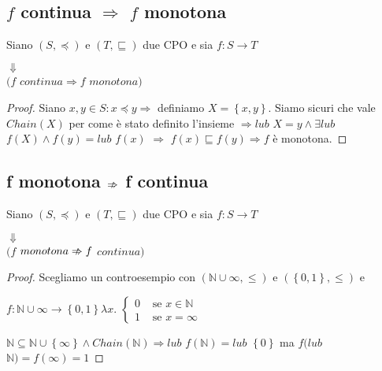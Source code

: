 \documentclass[a4paper, 10pt]{article} %
\begin{document}
\
\subsection{$f$  continua $\Rightarrow$ $f$  monotona}
\begin{esercizio}
  Siano $(S, \preceq)$ e $(T, \sqsubseteq)$ due CPO e sia $f: S \rightarrow T $
  \begin{center}
    $\Downarrow$\\
    $(f$ $continua \Rightarrow f$ $monotona)$
  \end{center}    
  \begin{proof}
    Siano $x,y \in S : x \preceq y \Rightarrow $ definiamo $X = \left\{x,y\right\}$. Siamo sicuri che vale $Chain(X)$ per come è stato definito l'insieme $\Rightarrow lub$ $X = y \land \exists lub$ $f(X) \land f(y) = lub$ $f(x)$ $\Rightarrow$ $f(x) \sqsubseteq f(y) \Rightarrow f$ è monotona.
  \end{proof}
\end{esercizio}

\newpage
\subsection{f monotona $\Arrownot \Rightarrow$ f continua}
\begin{esercizio}
  Siano $(S, \preceq)$ e $(T, \sqsubseteq)$ due CPO e sia $f: S \rightarrow T$
  \begin{center}
    $\Downarrow$\\
    $(f$ $monotona \Arrownot \Rightarrow f$ $continua)$
  \end{center}
  \begin{proof}
    Scegliamo un controesempio con $(\mathbb{N} \cup \infty, \leq)$ e $(\left\{0,1\right\},\leq)$ e
    \begin{center}
      $f: \mathbb{N} \cup \infty \rightarrow \left\{0,1\right\} \lambda x.$
      $\begin{cases}
        0 & \text{ se } x \in \mathbb{N}
        \\
        1 & \text{ se } x = \infty
      \end{cases}
      $
    \end{center}
    $\mathbb{N} \subseteq \mathbb{N} \cup \left\{\infty\right\} \land Chain(\mathbb{N}) \Rightarrow lub$ $f(\mathbb{N}) = lub$ $\left\{0\right\}$ ma $f(lub$ $\mathbb{N}) = f(\infty) = 1$
  \end{proof}
\end{esercizio}
\end{document}

